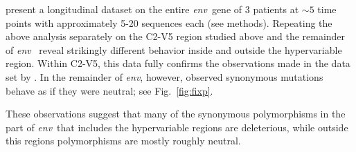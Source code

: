 \documentclass[rmp, twocolumn]{revtex4}
\newcommand{\env}{\textit{env}}
\newcommand{\FIG}[1]{Fig.~\ref{fig:#1}}
\begin{document}
\citet{bunnik_autologous_2008} present a longitudinal dataset on the entire
\env~gene of 3 patients at $\sim 5$ time points with approximately 5-20
sequences each (see methods). Repeating the above analysis separately on the C2-V5 region
studied above and the remainder of \env~ reveal strikingly different behavior
inside and outside the hypervariable region. Within C2-V5, this data fully
confirms the observations made in the data set by
\citet{shankarappa_consistent_1999}. In the remainder of \env, however, observed
synonymous mutations behave as if they were neutral; see \FIG{fixp}. 


These observations suggest that many of the synonymous polymorphisms in the part
of \env~that includes the hypervariable regions are deleterious, while outside
this regions polymorphisms are mostly roughly neutral.
\end{document}
